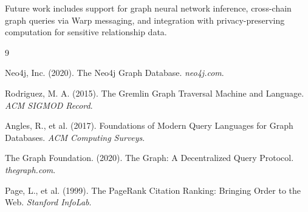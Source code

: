 \documentclass[11pt,a4paper]{article}
\theoremstyle{definition}
\begin{document}
Future work includes support for graph neural network inference, cross-chain graph queries via Warp messaging, and integration with privacy-preserving computation for sensitive relationship data.


\begin{thebibliography}{9}

Neo4j, Inc. (2020). The Neo4j Graph Database. \textit{neo4j.com}.

Rodriguez, M. A. (2015). The Gremlin Graph Traversal Machine and Language. \textit{ACM SIGMOD Record}.

Angles, R., et al. (2017). Foundations of Modern Query Languages for Graph Databases. \textit{ACM Computing Surveys}.

The Graph Foundation. (2020). The Graph: A Decentralized Query Protocol. \textit{thegraph.com}.

Page, L., et al. (1999). The PageRank Citation Ranking: Bringing Order to the Web. \textit{Stanford InfoLab}.

\end{thebibliography}
\end{document}
